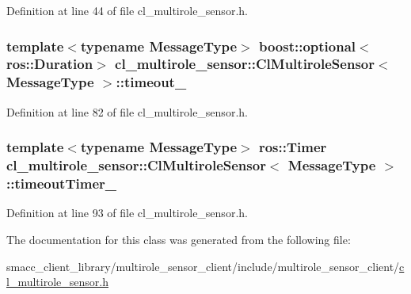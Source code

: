 Definition at line 44 of file cl\+\_\+multirole\+\_\+sensor.\+h.

\subsubsection[{\texorpdfstring{timeout\+\_\+}{timeout_}}]{\setlength{\rightskip}{0pt plus 5cm}template$<$typename Message\+Type$>$ boost\+::optional$<$ros\+::\+Duration$>$ {\bf cl\+\_\+multirole\+\_\+sensor\+::\+Cl\+Multirole\+Sensor}$<$ Message\+Type $>$\+::timeout\+\_\+}\hypertarget{classcl__multirole__sensor_1_1ClMultiroleSensor_a25cddc88db7d6208258630c0e5982f1e}{}\label{classcl__multirole__sensor_1_1ClMultiroleSensor_a25cddc88db7d6208258630c0e5982f1e}


Definition at line 82 of file cl\+\_\+multirole\+\_\+sensor.\+h.

\subsubsection[{\texorpdfstring{timeout\+Timer\+\_\+}{timeoutTimer_}}]{\setlength{\rightskip}{0pt plus 5cm}template$<$typename Message\+Type$>$ ros\+::\+Timer {\bf cl\+\_\+multirole\+\_\+sensor\+::\+Cl\+Multirole\+Sensor}$<$ Message\+Type $>$\+::timeout\+Timer\+\_\+\hspace{0.3cm}{\ttfamily [private]}}\hypertarget{classcl__multirole__sensor_1_1ClMultiroleSensor_abd24848b13def072d7e89b830937439f}{}\label{classcl__multirole__sensor_1_1ClMultiroleSensor_abd24848b13def072d7e89b830937439f}


Definition at line 93 of file cl\+\_\+multirole\+\_\+sensor.\+h.



The documentation for this class was generated from the following file\+:\begin{DoxyCompactItemize}
\item 
smacc\+\_\+client\+\_\+library/multirole\+\_\+sensor\+\_\+client/include/multirole\+\_\+sensor\+\_\+client/\hyperlink{cl__multirole__sensor_8h}{cl\+\_\+multirole\+\_\+sensor.\+h}\end{DoxyCompactItemize}
